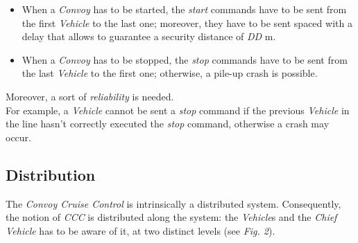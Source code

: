 \documentclass{llncs}
\begin{document}
\begin{itemize}
  \item When a \emph{Convoy} has to be started, the \emph{start} commands have to be sent from the first \emph{Vehicle} to the last one; moreover, they have to be sent spaced with a delay that allows to guarantee a security distance of \emph{DD} m.
  \item When a \emph{Convoy} has to be stopped, the \emph{stop} commands have to be sent from the last \emph{Vehicle} to the first one; otherwise, a pile-up crash is possible.
\end{itemize}

Moreover, a sort of \emph{reliability} is needed. \\ For example, a \emph{Vehicle} cannot be sent a \emph{stop} command if the previous \emph{Vehicle} in the line hasn't correctly executed the \emph{stop} command, otherwise a crash may occur.



\subsection{Distribution}
The \emph{Convoy Cruise Control} is intrinsically a distributed system. Consequently, the notion of \emph{CCC} is distributed along the system: the \emph{Vehicle}s and the \emph{Chief Vehicle} has to be aware of it, at two distinct levels (see \emph{Fig. 2}).\\

\end{document}
